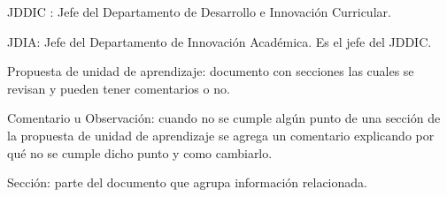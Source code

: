 ﻿%
JDDIC : Jefe del Departamento de Desarrollo e Innovación Curricular.

JDIA: Jefe del Departamento de Innovación Académica. Es el jefe del JDDIC.

Propuesta de unidad de aprendizaje: documento con secciones las cuales se revisan y pueden tener comentarios o no.

Comentario u Observación: cuando no se cumple algún punto de una sección de la propuesta de unidad de aprendizaje se agrega un comentario explicando por qué no se cumple dicho punto y como cambiarlo.

Sección: parte del documento que agrupa información relacionada.

